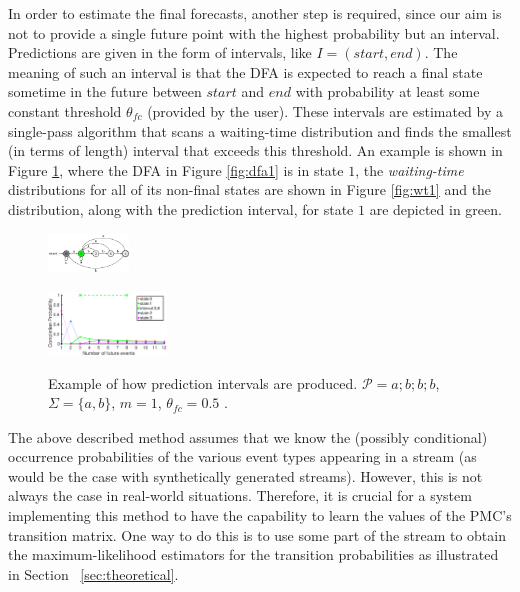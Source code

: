 \par In order to estimate the final forecasts, another step is required,
since our aim is not to provide a single future point with the highest probability but an interval. 
Predictions are given in the form of intervals, like $I=(\mathit{start},\mathit{end})$. 
The meaning of such an interval is that the DFA is expected to reach a final state sometime in the future between $\mathit{start}$ and $\mathit{end}$ with probability at least some constant threshold $\theta_{fc}$ (provided by the user). 
These intervals are estimated by a single-pass algorithm that scans a waiting-time distribution and finds the smallest (in terms of length) interval that exceeds this threshold. 
An example is shown in Figure \ref{fig:wtdfas},
where the DFA in Figure \ref{fig:dfa1} is in state $1$,
the \textit{waiting-time} distributions for all of its non-final states are shown in Figure \ref{fig:wt1}
and the distribution, along with the prediction interval, for state $1$ are depicted in green.
\begin{figure}[!ht]
\begin{centering}

\includegraphics[width=0.19\textwidth]{./chapters/figures/forecasting/dfa1.pdf}
\label{fig:dfa1}


\includegraphics[width=0.28\textwidth]{./chapters/figures/forecasting/wt1.pdf}
\label{fig:wt1}

\caption{Example of how prediction intervals are produced. 
$\mathcal{P}=a ; b ; b ; b$, $\Sigma=\{a,b\}$, $m=1$, $\theta_{\mathit{fc}}=0.5$      \cite{alevizos2017event}.}
\label{fig:wtdfas}
\end{centering}
\end{figure}

\par The above described method assumes that we know the (possibly conditional) occurrence probabilities of the various event types appearing in a stream
(as would be the case with synthetically generated streams).
However, this is not always the case in real-world situations.
Therefore, it is crucial for a system implementing this method to have the capability to learn the values of the PMC's transition matrix.
One way to do this is to use some part of the stream to obtain the maximum-likelihood estimators for the transition probabilities as illustrated in Section ~\ref{sec:theoretical}. 

